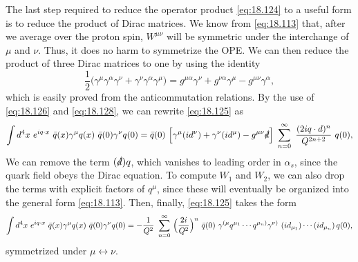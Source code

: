 The last step required to reduce the operator product \eqref{eq:18.124} to a
useful form is to reduce the product of Dirac matrices.  We know from
\eqref{eq:18.113} that, after we average over the proton spin,
$W^{\mu\nu}$ will be symmetric under the interchange of $\mu$ and $\nu$.
Thus, it does no harm to symmetrize the OPE.  We can then reduce the product
of three Dirac matrices to one by using the identity
\begin{equation}
  \frac{1}{2}\bigl( \gamma^\mu\gamma^\alpha\gamma^\nu + \gamma^\nu
    \gamma^\alpha\gamma^\mu \bigr) = g^{\mu\alpha}\gamma^\nu + g^{\nu\alpha}
    \gamma^\mu - g^{\mu\nu}\gamma^\alpha ,
  \label{eq:18.128}
\end{equation}
which is easily proved from the anticommutation relations.  By the use of
\eqref{eq:18.126} and \eqref{eq:18.128}, we can rewrite \eqref{eq:18.125} as
\begin{equation}
  \int d^4x\ e^{iq\cdot x}\ \bar{q}(x)\gamma^\mu q(x)\ \bar{q}(0)\gamma^\nu
    q(0) = \bar{q}(0)\ \Bigl[ \gamma^\mu(i d^\nu) + \gamma^\nu(i d^\mu)
      - g^{\mu\nu}\slashed{d} \Bigr]\ \sum_{n=0}^{\infty}\ \frac{(2iq\cdot d)^n}
        {Q^{2n+2}}\ q(0) ,
  \label{eq:18.129}
\end{equation}
We can remove the term $(\slashed{d})q$, which vanishes to leading order in
$\alpha_s$, since the quark field obeys the Dirac equation.  To compute $W_1$
and $W_2$, we can also drop the terms with explicit factors of $q^\mu$, since
these will eventually be organized into the general form \eqref{eq:18.113}.
Then, finally, \eqref{eq:18.125} takes the form
\begin{equation}
  \int d^4x\ e^{iq\cdot x}\ \bar{q}(x)\gamma^\mu q(x)\ \bar{q}(0)\gamma^\nu
    q(0) = -\frac{1}{Q^2}\ \sum_{n=0}^{\infty}\ \Bigl( \frac{2i}{Q^2}
      \Bigr)^n\ \bar{q}(0)\ \gamma^{(\mu}q^{\mu_1}\cdots q^{\mu_n)}
      \gamma^{\nu)}\ (id_{\mu_1})\cdots(id_{\mu_n})\,q(0) ,
  \label{eq:18.130}
\end{equation}
symmetrized under $\mu\leftrightarrow\nu$.

